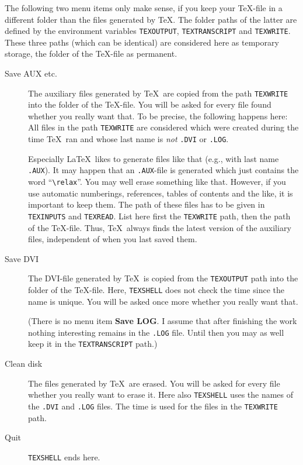 The following two menu items only make sense, if you keep 
your \TeX-file in a different folder than the files generated by
\TeX. The folder paths of the latter are defined by the
environment variables {\tt TEX\-OUT\-PUT},
{\tt TEX\-TRAN\-SCRIPT} and {\tt TEX\-WRITE}. 
These three paths (which can be identical)
are considered here as temporary storage, the folder of
the \TeX-file as permanent.

\begin{description}

\item[Save AUX etc.]
The auxiliary files generated by \TeX\ are copied from the path
{\tt TEX\-WRITE} into the folder of the \TeX-file.
You will be asked for every file found whether you really
want that. 
To be precise, the following happens here: 
All files in the path {\tt TEX\-WRITE}
are considered which were created during the time 
\TeX\ ran and whose last name is {\em not}
{\tt .DVI} or {\tt .LOG}.

Especially \LaTeX\ likes to generate
files like that (e.g., with last name {\tt .AUX}).
It may happen that an {\tt .AUX}-file is generated
which just contains the word ``\verb|\relax|''.
You may well erase something like that.
However, if you use automatic numberings, references,
tables of contents and the like,
it is important to keep them.
The path of these files has to be given in {\tt TEXINPUTS} and {\tt TEXREAD}.
List here first the {\tt TEXWRITE} path,
then the path of the \TeX-file. 
Thus, \TeX\ always finds the latest version of the auxiliary files,
independent of when you last saved them.

\item[Save DVI]
The DVI-file generated by \TeX\ is copied from the {\tt TEX\-OUT\-PUT} path
into the folder of the \TeX-file. 
Here, {\tt TEX\-SHELL} does not check the time since the name is unique.
You will be asked once more whether you really want that.

(There is no menu item {\bf Save LOG}. 
I assume
that after finishing the work nothing interesting remains in the
{\tt .LOG} file.
Until then you may as well keep it in the
{\tt TEXTRANSCRIPT} path.)

\item[Clean disk]
The files generated by \TeX\ are erased.
You will be asked for every file whether you really want to erase it.
Here also {\tt TEX\-SHELL} uses the names of the {\tt .DVI} and {\tt .LOG} 
files. The time is used for the files in the {\tt TEX\-WRITE} path.

\item[Quit]
{\tt TEX\-SHELL} ends here.
\end{description}


